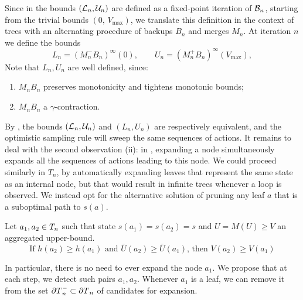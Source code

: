 \documentclass[runningheads]{llncs}
\begin{document}
Since in  the bounds $(\mathcal{L}_n, \mathcal{U}_n)$ are defined as a fixed-point iteration of $\mathcal{B}_n$, starting from the trivial bounds $(0,\, V_{\max})$, we translate this definition in the context of trees with an alternating procedure of backups $B_n$ and merges $M_n$. At iteration $n$ we define the bounds
\begin{equation}
\label{eq:tree-bounds}
L_n = (M_n^- B_n)^\infty(0), \qquad
U_n = (M_n^+ B_n)^\infty(V_{\max}),
\end{equation}
Note that $L_n, U_n$ are well defined, since:
\begin{lemma}[Properties of $M_nB_n$]
	\label{lem:properties-mb}
	\begin{enumerate}[label=(\roman*)]
		\item $M_n B_n$ preserves monotonicity and tightens monotonic bounds;
		\item $M_n B_n$ a $\gamma$-contraction.
	\end{enumerate}
\end{lemma}

By , the bounds $(\mathcal{L}_n, \mathcal{U}_n)$ and $(L_n, U_n)$ are respectively equivalent, and the optimistic sampling rule will sweep the same sequences of actions. It remains to deal with the second observation (ii): in , expanding a node simultaneously expands all the sequences of actions leading to this node. We could proceed similarly in $T_n$, by automatically expanding leaves that represent the same state as an internal node, but that would result in infinite trees whenever a loop is observed. We instead opt for the alternative solution of pruning any leaf $a$ that is a suboptimal path to $s(a)$.


\begin{proposition}
	\label{prop:pruning}
	Let $a_1,a_2\in T_n$ such that state $s(a_1) = s(a_2) = s$ and $U = M(U) \geq V$ an aggregated upper-bound. 
	\begin{equation}
	\label{eq:pruning}
	\text{If } h(a_2) \geq h(a_1) \text{ and } \overline{U}(a_2) \geq \overline{U}(a_1)
	\text{, then }V(a_2) \geq V(a_1)
	\end{equation}
	
	In particular, there is no need to ever expand the node $a_1$. We propose that at each step, we detect such pairs $a_1, a_2$. Whenever $a_1$ is a leaf, we can remove it from the set ${\partial T}_n^-\subset {\partial T}_n $ of candidates for expansion.
\end{proposition}
\end{document}
